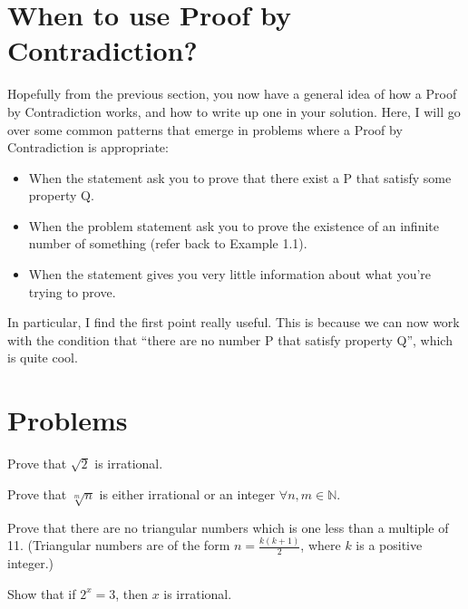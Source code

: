 \documentclass{article}
\theoremstyle{mytheoremstyle}
\theoremstyle{mytheoremstyle}
\theoremstyle{myproblemstyle}
\theoremstyle{myproblemstyle}
\begin{document}
    \clearpage

    \section{When to use Proof by Contradiction?}
        Hopefully from the previous section, you now have a general idea of how a Proof by Contradiction works, and how to write up one in your solution. Here, I will go over some common patterns that emerge in problems where a Proof by Contradiction is appropriate: 
        \begin{itemize}
            \item When the statement ask you to prove that there exist a P that satisfy some property Q.
            \item When the problem statement ask you to prove the existence of an infinite number of something (refer back to Example 1.1).
            \item When the statement gives you very little information about what you're trying to prove.
        \end{itemize}

        In particular, I find the first point really useful. This is because we can now work with the condition that ``there are no number P that satisfy property Q'', which is quite cool.
    \section{Problems}
    \bigskip

    \begin{problem}
        Prove that $\sqrt{2}$ is irrational.
    \end{problem}

    \begin{problem}
        Prove that $\sqrt[m]{n}$ is either irrational or an integer $\forall n, m \in \mathbb{N}$.
    \end{problem}

    \begin{problem}
        Prove that there are no triangular numbers which is one less than a multiple of 11. (Triangular numbers are of the form $n = \frac{k(k+1)}{2}$, where $k$ is a positive integer.)
    \end{problem}
        
    \begin{problem}
        Show that if $2^x = 3$, then $x$ is irrational.
    \end{problem}

    \begin{problem}
        
    \end{problem}
\end{document}
